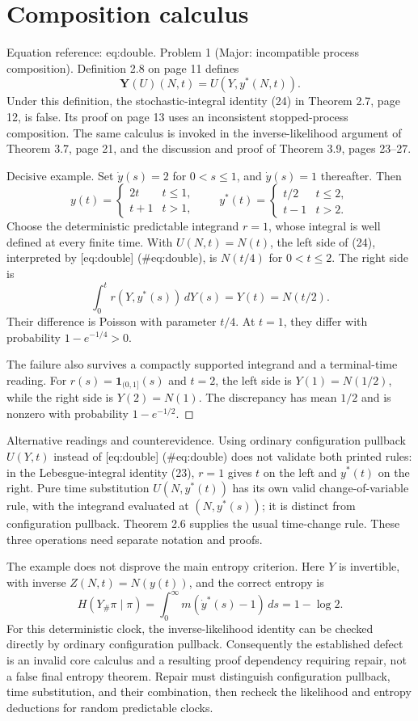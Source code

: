 \documentclass[10pt]{article}
\begin{document}
\section*{Composition calculus}
Equation reference: eq:double. Problem 1 (Major: incompatible process composition).  Definition 2.8 on page 11 defines \[
\mathbf Y(U)(N,t)=U(Y,y^*(N,t)).\] Under this definition, the stochastic-integral identity (24) in Theorem 2.7, page 12, is false. Its proof on page 13 uses an inconsistent stopped-process composition. The same calculus is invoked in the inverse-likelihood argument of Theorem 3.7, page 21, and the discussion and proof of Theorem 3.9, pages 23–27.\par
Decisive example. Set \(\dot y(s)=2\) for \(0<s\leq1\), and \(\dot y(s)=1\) thereafter. Then \[y(t)=\begin{cases}2t&t\leq1,\\t+1&t>1,\end{cases}
\qquad
y^*(t)=\begin{cases}t/2&t\leq2,\\t-1&t>2.\end{cases}\] Choose the deterministic predictable integrand \(r=1\), whose integral is well defined at every finite time. With \(U(N,t)=N(t)\), the left side of (24), interpreted by [eq:double] (\#eq:double), is \(N(t/4)\) for \(0<t\leq2\). The right side is \[\int_0^t r(Y,y^*(s))\,dY(s)=Y(t)=N(t/2).\] Their difference is Poisson with parameter \(t/4\). At \(t=1\), they differ with probability \(1-e^{-1/4}>0\).\par
The failure also survives a compactly supported integrand and a terminal-time reading. For \(r(s)=\mathbf1_{(0,1]}(s)\) and \(t=2\), the left side is \(Y(1)=N(1/2)\), while the right side is \(Y(2)=N(1)\). The discrepancy has mean \(1/2\) and is nonzero with probability \(1-e^{-1/2}\). ◻\par
Alternative readings and counterevidence. Using ordinary configuration pullback \(U(Y,t)\) instead of [eq:double] (\#eq:double) does not validate both printed rules: in the Lebesgue-integral identity (23), \(r=1\) gives \(t\) on the left and \(y^*(t)\) on the right. Pure time substitution \(U(N,y^*(t))\) has its own valid change-of-variable rule, with the integrand evaluated at \((N,y^*(s))\); it is distinct from configuration pullback. Theorem 2.6 supplies the usual time-change rule. These three operations need separate notation and proofs.\par
The example does not disprove the main entropy criterion. Here \(Y\) is invertible, with inverse \(Z(N,t)=N(y(t))\), and the correct entropy is \[H(Y_\#\pi\mid\pi)=\int_0^\infty m(\dot y^*(s)-1)\,ds
=1-\log2.\] For this deterministic clock, the inverse-likelihood identity can be checked directly by ordinary configuration pullback. Consequently the established defect is an invalid core calculus and a resulting proof dependency requiring repair, not a false final entropy theorem. Repair must distinguish configuration pullback, time substitution, and their combination, then recheck the likelihood and entropy deductions for random predictable clocks.\par
\end{document}

